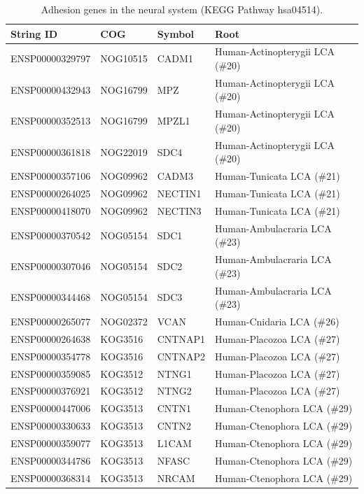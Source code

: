\begin{table}[H]

\caption{\label{tab:unnamed-chunk-8}Adhesion genes in the neural system (KEGG Pathway hsa04514).}
\begin{tabular}[t]{llll}
\toprule
String ID & COG & Symbol & Root\\
\midrule
\rowcolor{gray!6}  ENSP00000329797 & NOG10515 & CADM1 & Human-Actinopterygii LCA (\#20)\\
ENSP00000432943 & NOG16799 & MPZ & Human-Actinopterygii LCA (\#20)\\
\rowcolor{gray!6}  ENSP00000352513 & NOG16799 & MPZL1 & Human-Actinopterygii LCA (\#20)\\
ENSP00000361818 & NOG22019 & SDC4 & Human-Actinopterygii LCA (\#20)\\
\rowcolor{gray!6}  ENSP00000357106 & NOG09962 & CADM3 & Human-Tunicata LCA (\#21)\\
ENSP00000264025 & NOG09962 & NECTIN1 & Human-Tunicata LCA (\#21)\\
\rowcolor{gray!6}  ENSP00000418070 & NOG09962 & NECTIN3 & Human-Tunicata LCA (\#21)\\
ENSP00000370542 & NOG05154 & SDC1 & Human-Ambulacraria LCA (\#23)\\
\rowcolor{gray!6}  ENSP00000307046 & NOG05154 & SDC2 & Human-Ambulacraria LCA (\#23)\\
ENSP00000344468 & NOG05154 & SDC3 & Human-Ambulacraria LCA (\#23)\\
\rowcolor{gray!6}  ENSP00000265077 & NOG02372 & VCAN & Human-Cnidaria LCA (\#26)\\
ENSP00000264638 & KOG3516 & CNTNAP1 & Human-Placozoa LCA (\#27)\\
\rowcolor{gray!6}  ENSP00000354778 & KOG3516 & CNTNAP2 & Human-Placozoa LCA (\#27)\\
ENSP00000359085 & KOG3512 & NTNG1 & Human-Placozoa LCA (\#27)\\
\rowcolor{gray!6}  ENSP00000376921 & KOG3512 & NTNG2 & Human-Placozoa LCA (\#27)\\
ENSP00000447006 & KOG3513 & CNTN1 & Human-Ctenophora LCA (\#29)\\
\rowcolor{gray!6}  ENSP00000330633 & KOG3513 & CNTN2 & Human-Ctenophora LCA (\#29)\\
ENSP00000359077 & KOG3513 & L1CAM & Human-Ctenophora LCA (\#29)\\
\rowcolor{gray!6}  ENSP00000344786 & KOG3513 & NFASC & Human-Ctenophora LCA (\#29)\\
ENSP00000368314 & KOG3513 & NRCAM & Human-Ctenophora LCA (\#29)\\

\end{tabular}
\end{table}
